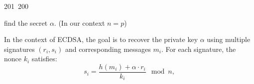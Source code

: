 201~200~\documentclass{article}
\begin{document}
	                                                                        	                                                                    	                                	                    	                    	                        	                        	                    	                                                                	                	                                                                    	                    	find the secret $\alpha$. (In our context $n = p$)

	                                                                        	                                                                    	                                	                    	                    	                        	                        	                    	                                                                	                	                                                                    	                    	In the context of ECDSA, the goal is to recover the private key $\alpha$ using multiple signatures $(r_i, s_i)$ and corresponding messages $m_i$. For each signature, the nonce $k_i$ satisfies:
	                                                                        	                                                                    	                                	                    	                    	                        	                        	                    	                                                                	                	                                                                    	                    	\[
	                                                                        	                                                                    	                                	                    	                    	                        	                        	                    	                                                                	                	                                                                    	                    		s_i = \frac{h(m_i) + \alpha \cdot r_i}{k_i} \mod n,
	                                                                        	                                                                    	                                	                    	                    	                        	                        	                    	                                                                	                	                                                                    	                    		\]
\end{document}
